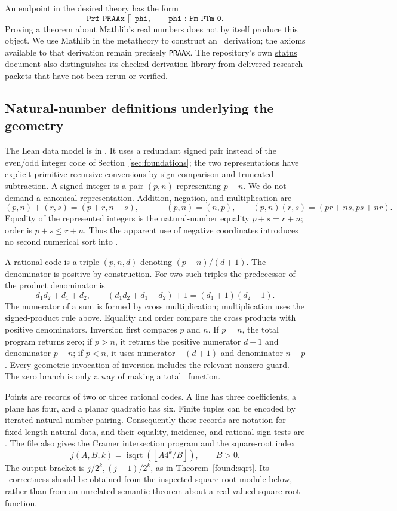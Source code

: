 An endpoint in the desired theory has the form
\[
   \texttt{Prf PRAAx [] phi},\qquad
   \texttt{phi : Fm PTm 0}.
\]
Proving a theorem about Mathlib's real numbers does not by itself produce this
object.  We use Mathlib in the metatheory to construct an \ipra\ derivation;
the axioms available to that derivation remain precisely
\texttt{PRAAx}.  The repository's own
\href{https://github.com/VladimirReshetnikov/ProveIt/blob/bbb85238dac533fc4b7b84a750cca864fe35fed5/Logic/PrimitiveRecursiveArithmetic/README.md}{status document}
also distinguishes its checked derivation library from delivered research
packets that have not been rerun or verified.

\subsection{Natural-number definitions underlying the geometry}

The Lean data model is in .  It uses a redundant signed
pair instead of the even/odd integer code of Section~\ref{sec:foundations};
the two representations have explicit primitive-recursive conversions by sign
comparison and truncated subtraction.  A signed integer is a pair
$(p,n)$ representing $p-n$.  We do not demand a canonical representation.
Addition, negation, and multiplication are
\[
 (p,n)+(r,s)=(p+r,n+s),\qquad -(p,n)=(n,p),
 \qquad (p,n)(r,s)=(pr+ns,ps+nr).
\]
Equality of the represented integers is the natural-number equality
$p+s=r+n$; order is $p+s\le r+n$.  Thus the apparent use of negative coordinates
introduces no second numerical sort into \ipra.

A rational code is a triple $(p,n,d)$ denoting $(p-n)/(d+1)$.
The denominator is positive by construction.  For two such triples the
predecessor of the product denominator is
\[
 d_1d_2+d_1+d_2,
 \qquad
 (d_1d_2+d_1+d_2)+1=(d_1+1)(d_2+1).
\]
The numerator of a sum is formed by cross multiplication; multiplication uses
the signed-product rule above.  Equality and order compare the cross products
with positive denominators.  Inversion first compares $p$ and $n$.  If $p=n$,
the total program returns zero; if $p>n$, it returns the positive numerator
$d+1$ and denominator $p-n$; if $p<n$, it uses numerator $-(d+1)$ and denominator
$n-p$.  Every geometric invocation of inversion includes the relevant nonzero
guard.  The zero branch is only a way of making a total \PR\ function.

Points are records of two or three rational codes.  A line has three
coefficients, a plane has four, and a planar quadratic has six.  Finite tuples
can be encoded by iterated natural-number pairing.  Consequently these records
are notation for fixed-length natural data, and their equality, incidence,
and rational sign tests are \PR.  The file also gives the Cramer intersection
program and the square-root index
\[
  j(A,B,k)=\operatorname{isqrt}\!\left(\left\lfloor
                A4^k/B\right\rfloor\right),\qquad B>0.
\]
The output bracket is $j/2^k,(j+1)/2^k$, as in Theorem~\ref{found:sqrt}.
Its \ipra\ correctness should be
obtained from the inspected square-root module below, rather than from an
unrelated semantic theorem about a real-valued square-root function.

